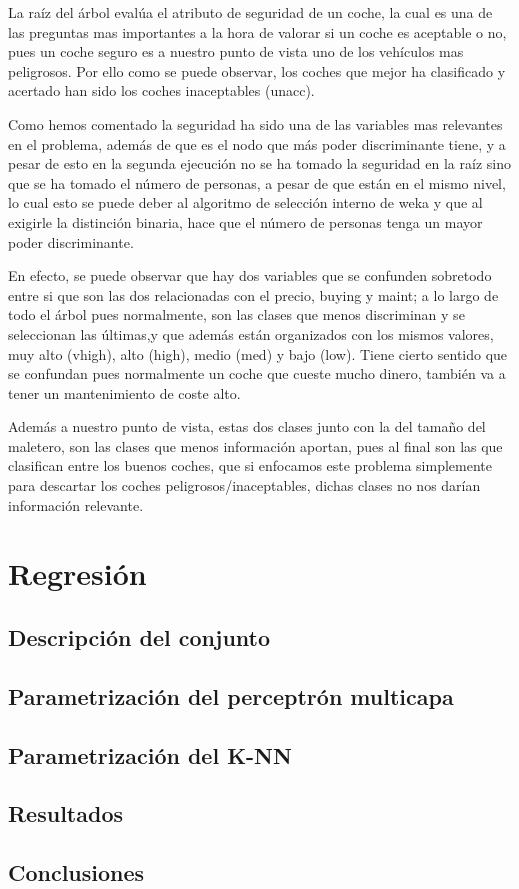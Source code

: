 \documentclass[a4paper, 11pt, twoside, openany, onecolumn, final]{memoir}
\begin{document}
	La raíz del árbol evalúa el atributo de seguridad de un coche, la cual es una de las preguntas mas importantes a la hora de valorar si un coche es aceptable o no, pues un coche seguro es a nuestro punto de vista uno de los vehículos mas peligrosos. Por ello como se puede observar, los coches que mejor ha clasificado y acertado han sido los coches inaceptables (unacc).
	
	Como hemos comentado la seguridad ha sido una de las variables mas relevantes en el problema, además de que es el nodo que más poder discriminante tiene, y a pesar de esto en la segunda ejecución no se ha tomado la seguridad en la raíz sino que se ha tomado el número de personas, a pesar de que están en el mismo nivel, lo cual esto se puede deber al algoritmo de selección interno de weka y que al exigirle la distinción binaria, hace que el número de personas tenga un mayor poder discriminante.   
	
	En efecto, se puede observar que hay dos variables que se confunden sobretodo entre si que son las dos relacionadas con el precio, buying y maint; a lo largo de todo el árbol pues normalmente, son las clases que menos discriminan y se seleccionan las últimas,y que además están organizados con los mismos valores, muy alto (vhigh), alto (high), medio (med) y bajo (low). Tiene cierto sentido que se confundan pues normalmente un coche que cueste mucho dinero, también va a tener un mantenimiento de coste alto. 
	
	Además a nuestro punto de vista, estas dos clases junto con la del tamaño del maletero, son las clases que menos información aportan, pues al final son las que clasifican entre los buenos coches, que si enfocamos este problema simplemente para descartar los coches peligrosos/inaceptables, dichas clases no nos darían información relevante.
	
	\chapter{Regresión}
		\section{Descripción del conjunto}
	\section{Parametrización del perceptrón multicapa}
	\section{Parametrización del K-NN}
	\section{Resultados}
	\section{Conclusiones}
\end{document}
